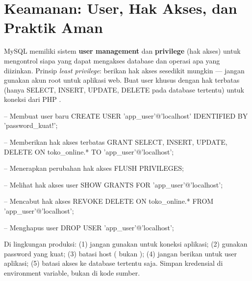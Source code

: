 \section{Keamanan: User, Hak Akses, dan Praktik Aman}

MySQL memiliki sistem \textbf{user management} dan \textbf{privilege} (hak akses) untuk mengontrol siapa yang dapat mengakses database dan operasi apa yang diizinkan. Prinsip \textit{least privilege}: berikan hak akses sesedikit mungkin --- jangan gunakan akun root untuk aplikasi web. Buat user khusus dengan hak terbatas (hanya SELECT, INSERT, UPDATE, DELETE pada database tertentu) untuk koneksi dari PHP \cite{mysqlDocs}.

\begin{webcode}[language=SQL, caption={Mengelola user dan hak akses MySQL}]
-- Membuat user baru
CREATE USER 'app_user'@'localhost' IDENTIFIED BY 'password_kuat!';

-- Memberikan hak akses terbatas
GRANT SELECT, INSERT, UPDATE, DELETE
  ON toko_online.* TO 'app_user'@'localhost';

-- Menerapkan perubahan hak akses
FLUSH PRIVILEGES;

-- Melihat hak akses user
SHOW GRANTS FOR 'app_user'@'localhost';

-- Mencabut hak akses
REVOKE DELETE ON toko_online.* FROM 'app_user'@'localhost';

-- Menghapus user
DROP USER 'app_user'@'localhost';
\end{webcode}

\begin{catatan}
Di lingkungan produksi: (1) jangan gunakan  untuk koneksi aplikasi; (2) gunakan password yang kuat; (3) batasi host ( bukan ); (4) jangan berikan  untuk user aplikasi; (5) batasi akses ke database tertentu saja. Simpan kredensial di environment variable, bukan di kode sumber.
\end{catatan}

